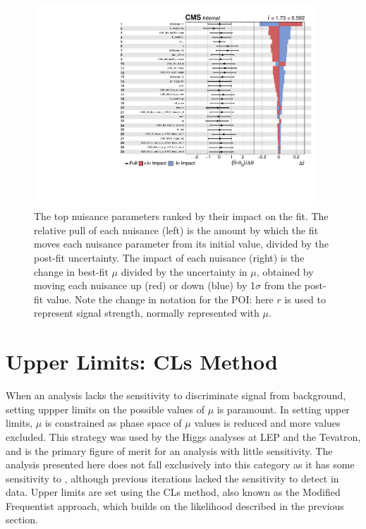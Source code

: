 \begin{figure}[htb]
        \centering 
        \includegraphics[width=0.95\textwidth]{ch11_figs/impacts_ttH_13TeV_top30.pdf}
        \caption[Nuisance parameter impacts]{The top nuisance parameters ranked by their impact on the fit. The relative pull of each nuisance (left) is the amount by which the fit moves each nuisance
          parameter from its initial value, divided by the post-fit uncertainty. The impact of each nuisance (right) is the change in best-fit $\mu$ divided by the uncertainty in $\mu$, obtained by
          moving each nuisance up (red) or down (blue) by 1$\sigma$ from the post-fit value. Note the change in notation for the POI: here $r$ is used to represent signal strength, normally represented with $\mu$.}
        \label{fig:impacts}
\end{figure}

\section{Upper Limits: CLs Method}
\label{sec:limit}
When an analysis lacks the sensitivity to discriminate signal from background, setting uppper limits on the possible values of $\mu$ is paramount. In setting upper
limits, $\mu$ is constrained as phase space of $\mu$ values is reduced and more values excluded. This strategy was used by the Higgs analyses at LEP and the Tevatron, and is the primary figure of merit
for an analysis with little sensitivity.
The \tth analysis presented here does not fall exclusively into this category as it has some sensitivity to \tth, although previous iterations lacked the sensitivity
to detect \tth in data. Upper limits are set using the CLs method, also known as the
Modified Frequentist approach, which builds on the likelihood described in the previous section. 

